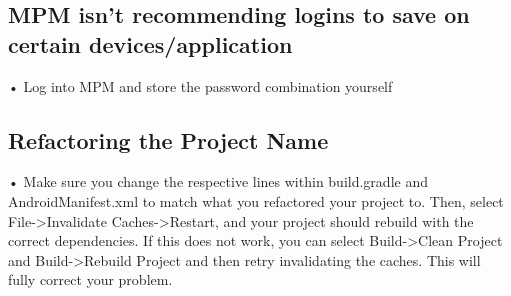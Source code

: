 \documentclass[letterpaper,12pt]{report}
\begin{document}
\subsection*{MPM isn't recommending logins to save on certain devices/application}

• Log into MPM and store the password combination yourself
    
\subsection*{Refactoring the Project Name}

• Make sure you change the respective lines within build.gradle and AndroidManifest.xml to match what you refactored your project to. Then, select File->Invalidate Caches->Restart, and your project should rebuild with the correct dependencies. If this does not work, you can select Build->Clean Project and Build->Rebuild Project and then retry invalidating the caches. This will fully correct your problem.



\end{document}
